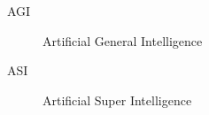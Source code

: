 \begin{description}
    \item[AGI] Artificial General Intelligence 
\end{description}

\begin{description}
    \item[ASI] Artificial Super Intelligence
\end{description}